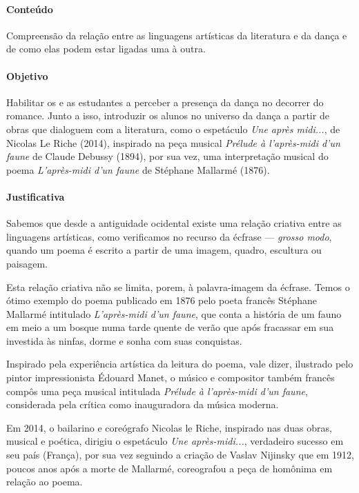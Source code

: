 \documentclass[12pt]{extarticle}
\begin{document}
\paragraph{Conteúdo} Compreensão da relação entre as linguagens artísticas
da literatura e da dança e de como elas podem estar ligadas uma à outra. 

\paragraph{Objetivo} Habilitar os e as estudantes a perceber a presença
da dança no decorrer do romance. Junto a isso, introduzir os alunos
no universo da dança a partir de obras que dialoguem com a literatura,
como o espetáculo \textit{Une après midi...}, de Nicolas Le Riche
(2014), inspirado na peça musical \textit{Prélude à l'après-midi
d'un faune} de Claude Debussy (1894), por sua
vez, uma interpretação musical do poema \textit{L'après-midi d'un faune} 
de Stéphane Mallarmé (1876).

\paragraph{Justificativa} Sabemos que desde a antiguidade ocidental existe
uma relação criativa entre as linguagens artísticas, como verificamos
no recurso da écfrase --- \textit{grosso modo}, quando um poema é escrito 
a partir de uma imagem, quadro, escultura ou paisagem. 

Esta relação criativa não se limita, porem, à palavra-imagem da écfrase. 
Temos o ótimo exemplo do poema publicado em 1876 pelo poeta francês Stéphane Mallarmé intitulado
\textit{L'après-midi d'un faune}, que conta a história de um fauno em meio
a um bosque numa tarde quente de verão que após fracassar em sua investida
às ninfas, dorme e sonha com suas conquistas. 

Inspirado pela experiência artística da leitura do poema, vale dizer, ilustrado 
pelo pintor impressionista Édouard Manet, o músico e compositor também
francês compôs uma peça musical intitulada \textit{Prélude à l'après-midi
d'un faune}, considerada pela crítica como inauguradora da música moderna. 

Em 2014, o bailarino e coreógrafo Nicolas le Riche, inspirado nas duas obras,
musical e poética, dirigiu o espetáculo \textit{Une après-midi...}, verdadeiro 
sucesso em seu país (França), por sua vez seguindo a criação de Vaslav Nijinsky
que em 1912, poucos anos após a morte de Mallarmé, coreografou a peça de homônima
em relação ao poema. 
\end{document}
